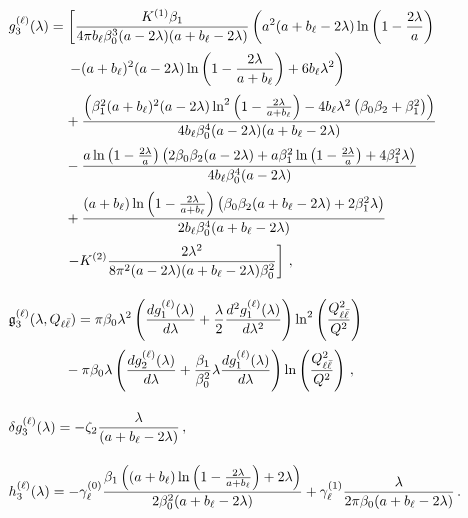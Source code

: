 \begin{subequations}
\begin{align}
	&g_3^{(\ell)}(\lambda)=\left[\frac{K^{(1)}\beta_1}{4\pi b_{\ell}\beta_0^3(a-2\lambda)(a+b_{\ell}-2\lambda)}\left(a^2(a+b_{\ell}-2\lambda)\ln\left(1-\frac{2\lambda}{a}\right)\right.\right.\notag\\[0.5ex]
	&\qquad\qquad\left.\left.-(a+b_{\ell})^2(a-2\lambda)\ln\left(1-\frac{2\lambda}{a+b_{\ell}}\right)+6b_{\ell}\lambda^2\right)\right.\notag \\[0.5ex]
	&\qquad\qquad+\frac{\left(\beta_1^2(a+b_{\ell})^2(a-2\lambda)\ln^2\left(1-\frac{2\lambda}{a+b_{\ell}}\right)-4b_{\ell}\lambda^2\left(\beta_0\beta_2+\beta_1^2\right)\right)}{4 b_{\ell}\beta_0^4(a-2\lambda)(a+b_{\ell}-2\lambda)} \notag \\[0.5ex]
	&\qquad\qquad-\frac{a\ln\left(1-\frac{2\lambda}{a}\right)\left(2\beta_0\beta_2(a-2\lambda)+a\beta_1^2\ln\left(1-\frac{2\lambda}{a}\right)+4\beta_1^2\lambda\right)}{4b_{\ell}\beta_0^4(a-2\lambda)} \notag\\[0.5ex]
	&\qquad\qquad+\frac{(a+b_{\ell})\ln\left(1-\frac{2\lambda}{a+b_{\ell}}\right)\left(\beta_0\beta_2(a+b_{\ell}-2\lambda)+2\beta_1^2\lambda\right)}{2b_{\ell}\beta_0^4(a+b_{\ell}-2\lambda)} \notag\\[0.5ex]
	&\left.\qquad\qquad -K^{(2)}\frac{2\lambda^2}{8\pi^2(a-2\lambda)(a+b_{\ell}-2\lambda)\beta_0^2} \right]\,, \\[2.5ex]
&\mathfrak{g}_3^{(\ell)}(\lambda,Q_{\ell\bar\ell})=\pi\beta_0\lambda^2\left(\frac{dg_1^{(\ell)}(\lambda)}{d\lambda}+\frac{\lambda}{2}\frac{d^2g_1^{(\ell)}(\lambda)}{d\lambda^2}\right)\ln^2\left(\frac{Q_{\ell\bar\ell}^2}{Q^2}\right)\notag \\[0.5ex]
&\qquad\qquad -\pi\beta_0\lambda\left(\frac{dg_2^{(\ell)}(\lambda)}{d\lambda}+\frac{\beta_1}{\beta_0^2}\lambda\frac{dg_1^{(\ell)}(\lambda)}{d\lambda}\right)\ln\left(\frac{Q_{\ell\bar\ell}^2}{Q^2}\right)\,, \\[2.5ex]
&\delta g_3^{(\ell)}(\lambda)=-\zeta_2\frac{\lambda}{(a+b_{\ell}-2\lambda)}\,,\\[2.5ex]
&h_3^{(\ell)}(\lambda)=-\gamma_{\ell}^{(0)}\frac{\beta_1\left((a+b_{\ell})\ln\left(1-\frac{2\lambda}{a+b_{\ell}}\right)+2\lambda\right)}{2\beta_0^2(a+b_{\ell}-2\lambda)}
+\gamma_{\ell}^{(1)}\frac{\lambda}{2\pi\beta_0(a+b_{\ell}-2\lambda)}\,.
\end{align}
\end{subequations}

